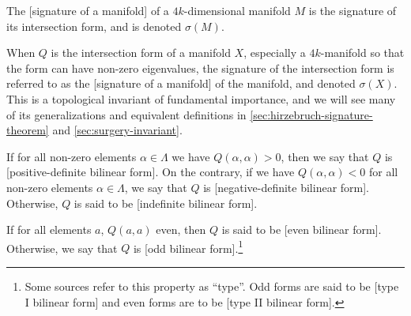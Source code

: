 \begin{definition}
	The [signature of a manifold] of a $4k$-dimensional manifold $M$ is the signature of its intersection form, and is denoted $\sigma(M)$.
\end{definition}

When $Q$ is the intersection form of a manifold $X$, especially a $4k$-manifold so that the form can have non-zero eigenvalues, the signature of the intersection form is referred to as the [signature of a manifold] of the manifold, and denoted $\sigma(X)$. This is a topological invariant of fundamental importance, and we will see many of its generalizations and equivalent definitions in \cref{sec:hirzebruch-signature-theorem} and \cref{sec:surgery-invariant}.

\begin{definition}
	If for all non-zero elements $\alpha\in \Lambda$ we have $Q(\alpha,\alpha)>0$, then we say that $Q$ is [positive-definite bilinear form]. On the contrary, if we have $Q(\alpha,\alpha)<0$ for all non-zero elements $\alpha\in \Lambda$, we say that $Q$ is [negative-definite bilinear form]. Otherwise, $Q$ is said to be [indefinite bilinear form].
\end{definition}

\begin{definition}
	If for all elements $a$, $Q(a,a)$ even, then $Q$ is said to be [even bilinear form]. Otherwise, we say that $Q$ is [odd bilinear form].\footnote{Some sources refer to this property as ``type''. Odd forms are said to be [type I bilinear form] and even forms are to be [type II bilinear form].}
\end{definition}

\medskip
{}
